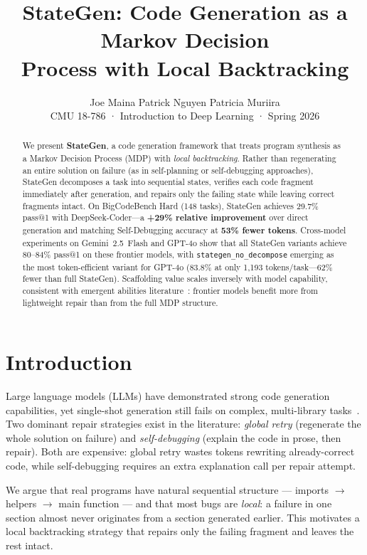 \documentclass[11pt,twocolumn]{article}
\title{\textbf{StateGen: Code Generation as a Markov Decision\\
Process with Local Backtracking}}
\author{
  Joe Maina \quad Patrick Nguyen \quad Patricia Muriira \\
  CMU 18-786 · Introduction to Deep Learning · Spring 2026
}
\date{}
\begin{document}
\maketitle

\begin{abstract}
We present \textbf{StateGen}, a code generation framework that treats program
synthesis as a Markov Decision Process (MDP) with \emph{local backtracking}.
Rather than regenerating an entire solution on failure (as in self-planning or
self-debugging approaches), StateGen decomposes a task into sequential states,
verifies each code fragment immediately after generation, and repairs only the
failing state while leaving correct fragments intact.
On BigCodeBench Hard (148 tasks), StateGen achieves 29.7\% pass@1 with
DeepSeek-Coder---a \textbf{+29\% relative improvement} over direct generation
and matching Self-Debugging accuracy at \textbf{53\% fewer tokens}.
Cross-model experiments on Gemini~2.5~Flash and GPT-4o show that all StateGen
variants achieve 80--84\% pass@1 on these frontier models, with
\texttt{stategen\_no\_decompose} emerging as the most token-efficient variant
for GPT-4o (83.8\% at only 1,193 tokens/task---62\% fewer than full StateGen).
Scaffolding value scales inversely with model capability, consistent with
emergent abilities literature~\cite{wei2022emergent}: frontier models benefit
more from lightweight repair than from the full MDP structure.
\end{abstract}

\section{Introduction}

Large language models (LLMs) have demonstrated strong code generation
capabilities, yet single-shot generation still fails on complex, multi-library
tasks~\cite{zhuo2024bigcodebench}. Two dominant repair strategies exist in the
literature: \emph{global retry} (regenerate the whole solution on failure) and
\emph{self-debugging} (explain the code in prose, then repair).
Both are expensive: global retry wastes tokens rewriting already-correct code,
while self-debugging requires an extra explanation call per repair attempt.

We argue that real programs have natural sequential structure ---
imports $\to$ helpers $\to$ main function --- and that most bugs are \emph{local}:
a failure in one section almost never originates from a section generated
earlier. This motivates a local backtracking strategy that repairs only the
failing fragment and leaves the rest intact.
\end{document}
